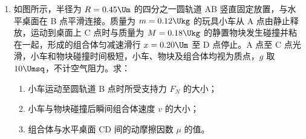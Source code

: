 \documentclass[\gkver]{gaokaozhenti}
\begin{document}
\begin{enumerate}
{流过电阻的最大电流约为 $I_{max} = \frac{E}{R_{x}} = \frac{3}{5} \UA = 0.6 \UA$，为了减小误差，电流表选用量程为 $0.6 \UA$ 的 C。

②电流表和电压表示数都为零，在不可能是 4、5 导线内部断开，该同学用多用电表的直流电压挡测量电源正极 a 与接线柱 b 间电压，读数为零；测量 a 与接线柱 c 间电压，读数不为零，则可以确定导线 6 内部断开。

③根据电路图可得
$I = \frac{U}{R_{\mathrm{V}}} + \frac{U}{R_{x}}$

整理可得
$U = \frac{R_{\mathrm{V}}R_{x}}{R_{x} + R_{\mathrm{V}}}I$

则 $\frac{R_{\mathrm{V}}R_{x}}{R_{x} + R_{\mathrm{V}}} = k$

可得 $R_{x} = \frac{kR_{\mathrm{V}}}{R_{\mathrm{V}} - k}$
}

\item
如图所示，半径为 $R = 0.45 \Um$ 的四分之一圆轨道 AB 竖直固定放置，与水平桌面在 B 点平滑连接。质量为 $m = 0.12 \Ukg$ 的玩具小车从 A 点由静止释放，运动到桌面上 C 点时与质量为 $M = 0.18 \Ukg$ 的静置物块发生碰撞并粘在一起，形成的组合体匀减速滑行 $x = 0.20 \Um$ 至 D 点停止。A 点至 C 点光滑，小车和物块碰撞时间极短，小车、物块及组合体均视为质点，$g$ 取 $10 \Umsq$，不计空气阻力。求：
\begin{enumerate}
\item
小车运动至圆轨道 B 点时所受支持力 $F_{N}$ 的大小；
\item
小车与物块碰撞后瞬间组合体速度 $v$ 的大小；
\item
组合体与水平桌面 CD 间的动摩擦因数 $\mu$ 的值。
\end{enumerate}


\end{enumerate}
\end{document}
